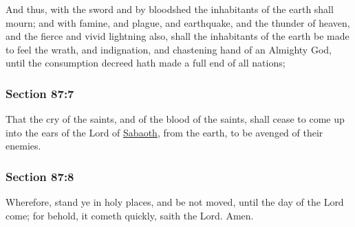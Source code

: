 		And thus, with the sword and by bloodshed the inhabitants of the earth shall mourn; and with famine, and plague, and earthquake, and the thunder of heaven, and the fierce and vivid lightning also, shall the inhabitants of the earth be made to feel the wrath, and indignation, and chastening hand of an Almighty God, until the consumption decreed hath made a full end of all nations;


	\subsubsection{Section 87:7} %
		\label{DC87-7}

		That the cry of the saints, and of the blood of the saints, shall cease to come up into the ears of the Lord of \hyperref[SABAOTH]{Sabaoth}, from the earth, to be avenged of their enemies.


	\subsubsection{Section 87:8} %
		\label{DC87-8}

		Wherefore, stand ye in holy places, and be not moved, until the day of the Lord come; for behold, it cometh quickly, saith the Lord.  Amen.

